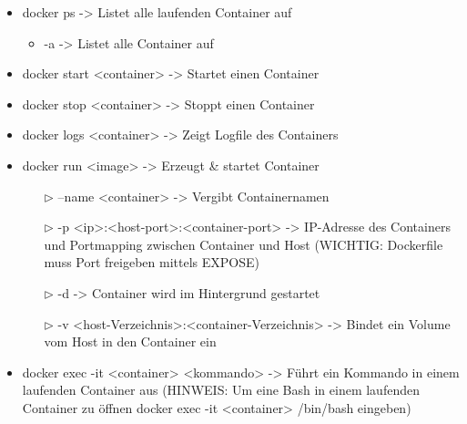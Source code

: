 \begin{itemize}
	\item docker ps -> Listet alle laufenden Container auf
	\begin{itemize}
		\item -a -> Listet alle Container auf
	\end{itemize}
	
	\item docker start <container> -> Startet einen Container
	\item docker stop <container> -> Stoppt einen Container
	\item docker logs <container> -> Zeigt Logfile des Containers 
	\item docker run <image> -> Erzeugt \& startet Container
	\begin{itemize}
		\item[$\triangleright$] --name <container> -> Vergibt Containernamen
		\item[$\triangleright$] -p <ip>:<host-port>:<container-port> -> IP-Adresse des Containers und Portmapping zwischen Container und Host (WICHTIG: Dockerfile muss Port freigeben mittels EXPOSE)
		\item[$\triangleright$] -d -> Container wird im Hintergrund gestartet
		\item[$\triangleright$] -v <host-Verzeichnis>:<container-Verzeichnis> -> Bindet ein Volume vom Host in den Container ein
	\end{itemize}
	\item docker exec -it <container> <kommando> -> Führt ein Kommando in einem laufenden Container aus (HINWEIS: Um eine Bash in einem laufenden Container zu öffnen docker exec -it <container> /bin/bash eingeben)
\end{itemize}